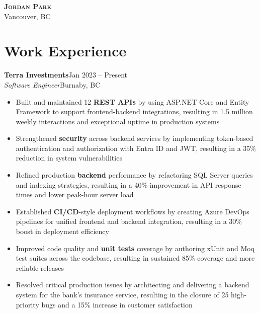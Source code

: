 \documentclass[11pt, letterpaper]{article}
\newcommand{\entry}[2]{%
    \noindent\textbf{#1}\hfill#2\\[0pt]%
}
\newcommand{\subentry}[2]{%
    \noindent\textit{#1}\hfill#2\\[-12pt]%
}
\begin{document}
\begin{center}
      {\huge\scshape\textbf{Jordan Park}}\\[5pt]
      \small Vancouver, BC\\[3pt]
  \end{center}

\section{Work Experience}
\entry{Terra Investments}{Jan 2023 -- Present}
\subentry{Software Engineer}{Burnaby, BC}
\begin{itemize}
    \item Built and maintained 12 \textbf{REST APIs} by using ASP.NET Core and Entity Framework to support frontend-backend integrations, resulting in 1.5 million weekly interactions and exceptional uptime in production systems
    \item Strengthened \textbf{security} across backend services by implementing token-based authentication and authorization with Entra ID and JWT, resulting in a 35\% reduction in system vulnerabilities
    \item Refined production \textbf{backend} performance by refactoring SQL Server queries and indexing strategies, resulting in a 40\% improvement in API response times and lower peak-hour server load
    \item Established \textbf{CI/CD}-style deployment workflows by creating Azure DevOps pipelines for unified frontend and backend integration, resulting in a 30\% boost in deployment efficiency
    \item Improved code quality and \textbf{unit tests} coverage by authoring xUnit and Moq test suites across the codebase, resulting in sustained 85\% coverage and more reliable releases
    \item Resolved critical production issues by architecting and delivering a backend system for the bank's insurance service, resulting in the closure of 25 high-priority bugs and a 15\% increase in customer satisfaction
\end{itemize}
\vspace{4pt}
\end{document}
